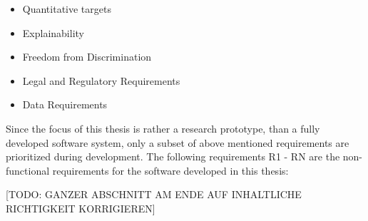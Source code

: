 \begin{itemize}
    \item Quantitative targets
    \item Explainability
    \item Freedom from Discrimination
    \item Legal and Regulatory Requirements
    \item Data Requirements
\end{itemize}

Since the focus of this thesis is rather a research prototype, than a fully developed software system, only a subset of above mentioned requirements are prioritized during development.
The following requirements R1 - RN are the non-functional requirements for the software developed in this thesis:

[TODO: GANZER ABSCHNITT AM ENDE AUF INHALTLICHE RICHTIGKEIT KORRIGIEREN]
